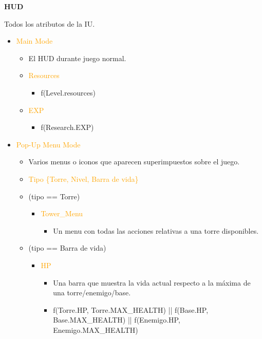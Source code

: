 \documentclass{article}
\begin{document}
\clearpage

\noindent \textbf{HUD}

\hfill \break \noindent Todos los atributos de la IU.

\begin{itemize}
    \item \textcolor{Orange}{Main Mode}
    \begin{itemize}
		\item El HUD durante juego normal.
		\item \textcolor{Orange}{Resources}
		\begin{itemize}
			\item f(Level.resources)
		\end{itemize}
		\item \textcolor{Orange}{EXP}
		\begin{itemize}
			\item f(Research.EXP)
		\end{itemize}
    \end{itemize}
    \item \textcolor{Orange}{Pop-Up Menu Mode}
    \begin{itemize}
        \item Varios menus o iconos que aparecen superimpuestos sobre el juego.
		\item \textcolor{Orange}{Tipo \{Torre, Nivel, Barra de vida\}}
    	\item (tipo == Torre)
    	\begin{itemize}
            \item \textcolor{Orange}{Tower\_Menu}
        	\begin{itemize}
        		\item Un menu con todas las acciones relativas a una torre disponibles.
        	\end{itemize}
        \end{itemize}
        \item (tipo == Barra de vida)
        \begin{itemize}
        	\item \textcolor{Orange}{HP}
        	\begin{itemize}
                \item Una barra que muestra la vida actual respecto a la máxima de una torre/enemigo/base.
        		\item f(Torre.HP, Torre.MAX\_HEALTH) || f(Base.HP, Base.MAX\_HEALTH) || f(Enemigo.HP, Enemigo.MAX\_HEALTH)
            \end{itemize}

\end{itemize}
\end{itemize}
\end{itemize}
\end{document}
